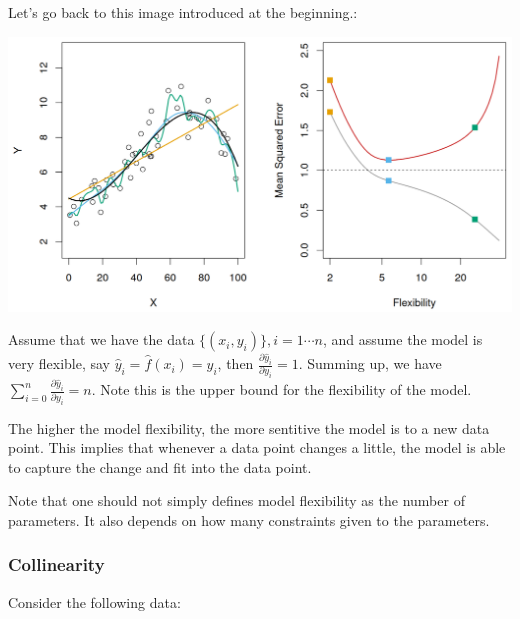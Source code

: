 \documentclass{article}
\theoremstyle{MyNonumberplain}
\theoremstyle{break}
\newcommand{\pd}[2]{\frac{\partial {#1}}{\partial {#2}}}
\theoremstyle{break}
\theoremstyle{break}
\theoremstyle{break}
\begin{document}
Let's go back to this image introduced at the beginning.:

\begin{center}
    \includegraphics*[scale=0.3]{Images/img2.png}
\end{center}

Assume that we have the data $\bigl\{(x_i,y_i)\bigr\},i=1\cdots n$, and assume the model is very flexible, say $\hat y_i=\hat f(x_i)=y_i$,
then $\pd{\hat y_i}{y_i}=1$. Summing up, we have $\sum_{i=0}^n \pd{\hat y_i}{y_i}=n$. Note this is the upper bound for the flexibility of the model.

The higher the model flexibility, the more sentitive the model is to a new data point. This implies that whenever a data point changes a little, the model
is able to capture the change and fit into the data point.

Note that one should not simply defines model flexibility as the number of parameters. 
It also depends on how many constraints given to the parameters.

\subsubsection{Collinearity}

Consider the following data:
\end{document}
